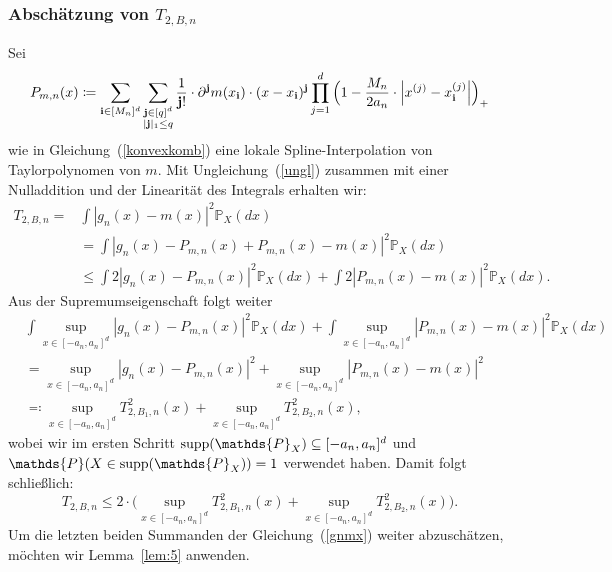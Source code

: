 \subsubsection{Abschätzung von $T_{2,B,n}$}
Sei 
\begin{equation*}
\begin{split}
P_{m,n}(x) \coloneqq \sum_{\mathbf{i} \in [M_n]^d} \sum_{\substack{ \mathbf{j} \in [q]^d \\ |\mathbf{j}|_1 \leq q}} \frac{1}{\mathbf{j}!} \cdot \partial^{\mathbf{j}} m (x_{\mathbf{i}}) \cdot (x - x_{\mathbf{i}})^{\mathbf{j}} \prod_{j = 1}^d\Big(1 - \frac{M_n}{2a_n} \cdot \Big|x^{(j)} - x_{\mathbf{i}}^{(j)}\Big|\Big)_+
\end{split}
\end{equation*}
wie in Gleichung~(\ref{konvexkomb}) eine lokale Spline-Interpolation von Taylorpolynomen von $m$.
Mit Ungleichung~(\ref{ungl}) zusammen mit einer Nulladdition und der Linearität des Integrals erhalten wir:
\begin{equation*}
\begin{split}
T_{2,B,n} = & \int |g_n(x) - m(x)|^2 \mathds{P}_X(dx) \\
& = \int |g_n(x) - P_{m,n}(x) + P_{m,n}(x) - m(x)|^2 \mathds{P}_X(dx) \\
& \leq \int 2 |g_n(x) - P_{m,n}(x)|^2 \mathds{P}_X(dx) + \int 2 |P_{m,n}(x) - m(x)|^2 \mathds{P}_X(dx).
\end{split}
\end{equation*}
Aus der Supremumseigenschaft folgt weiter
\begin{equation}
\label{gnmx}
\begin{split}
&  \int \sup_{x \in [-a_n, a_n]^d} |g_n(x) - P_{m,n}(x)|^2 \mathds{P}_X(dx) +  \int \sup_{x \in [-a_n, a_n]^d} |P_{m,n}(x) - m(x)|^2 \mathds{P}_X(dx) \\[0.5em]
& =  \sup_{x \in [-a_n, a_n]^d} |g_n(x) - P_{m,n}(x)|^2 +  \sup_{x \in [-a_n, a_n]^d} |P_{m,n}(x) - m(x)|^2  \\[0.5em]
& \eqqcolon  \sup_{x \in [-a_n, a_n]^d} T_{2,B_1,n}^2(x) +  \sup_{x \in [-a_n, a_n]^d} T_{2,B_2,n}^2(x),
\end{split}
\end{equation}
wobei wir im ersten Schritt $\supp(\mathds{P}_X) \subseteq [-a_n, a_n]^d$ und $\mathds{P}(X \in \supp(\mathds{P}_X)) = 1$ verwendet haben. Damit folgt schließlich:
$$T_{2,B,n} \leq 2 \cdot \Big(\sup_{x \in [-a_n, a_n]^d} T_{2,B_1,n}^2(x) +  \sup_{x \in [-a_n, a_n]^d} T_{2,B_2,n}^2(x)\Big).$$
Um die letzten beiden Summanden der Gleichung~(\ref{gnmx}) weiter abzuschätzen, möchten wir Lemma~\ref{lem:5} anwenden. 

